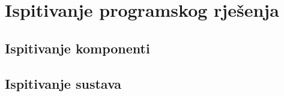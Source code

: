 	
		\section{Ispitivanje programskog rješenja}
			
%			
	
			
			\subsection{Ispitivanje komponenti}
			
			
			
			\subsection{Ispitivanje sustava}
			
%			 
%			
			\eject 
		
